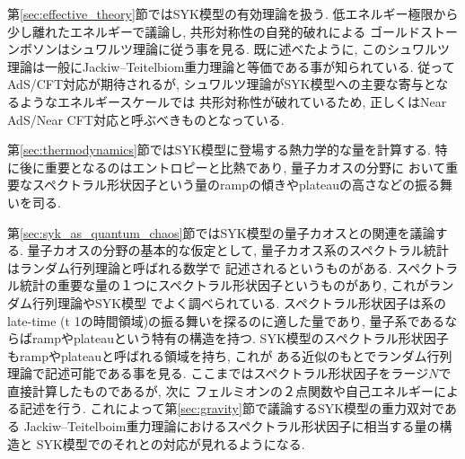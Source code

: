 第\ref{sec:effective_theory}節ではSYK模型の有効理論を扱う. 
低エネルギー極限から少し離れたエネルギーで議論し, 共形対称性の自発的破れによる
ゴールドストーンボソンはシュワルツ理論に従う事を見る. 
既に述べたように, このシュワルツ理論は一般にJackiw--Teitelbiom重力理論と等価である事が知られている. 
従ってAdS/CFT対応が期待されるが, シュワルツ理論がSYK模型への主要な寄与となるようなエネルギースケールでは
共形対称性が破れているため, 正しくはNear AdS/Near CFT対応と呼ぶべきものとなっている. 

第\ref{sec:thermodynamics}節ではSYK模型に登場する熱力学的な量を計算する. 
特に後に重要となるのはエントロピーと比熱であり, 量子カオスの分野に
おいて重要なスペクトラル形状因子という量のrampの傾きやplateauの高さなどの振る舞いを司る. 

第\ref{sec:syk_as_quantum_chaos}節ではSYK模型の量子カオスとの関連を議論する. 
量子カオスの分野の基本的な仮定として, 量子カオス系のスペクトラル統計はランダム行列理論と呼ばれる数学で
記述されるというものがある. 
スペクトラル統計の重要な量の１つにスペクトラル形状因子というものがあり, これがランダム行列理論やSYK模型
でよく調べられている. 
スペクトラル形状因子は系のlate-time (t \gg 1の時間領域)の振る舞いを探るのに適した量であり, 
量子系であるならばrampやplateauという特有の構造を持つ. 
SYK模型のスペクトラル形状因子もrampやplateauと呼ばれる領域を持ち, これが
ある近似のもとでランダム行列理論で記述可能である事を見る. 
ここまではスペクトラル形状因子をラージ$N$で直接計算したものであるが, 次に
フェルミオンの２点関数や自己エネルギーによる記述を行う. 
これによって第\ref{sec:gravity}節で議論するSYK模型の重力双対である
Jackiw--Teitelboim重力理論におけるスペクトラル形状因子に相当する量の構造と
SYK模型でのそれとの対応が見れるようになる. 

\pagebreak
